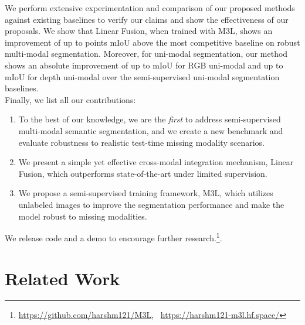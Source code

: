 \documentclass[10pt,twocolumn,letterpaper]{article}
\begin{document}
We perform extensive experimentation and comparison of our proposed methods against existing baselines to verify our claims and show the effectiveness of our proposals. We show that Linear Fusion, when trained with M3L, shows an improvement of up to  points mIoU above the most competitive baseline on robust multi-modal segmentation. Moreover, for uni-modal segmentation, our method shows an absolute improvement of up to  mIoU for RGB uni-modal and up to  mIoU for depth uni-modal over the semi-supervised uni-modal segmentation baselines.\\
Finally, we list all our contributions:

\begin{enumerate}

\item To the best of our knowledge, we are the \textit{first} to address semi-supervised multi-modal semantic segmentation, and we create a new benchmark and evaluate robustness to realistic test-time missing modality scenarios.

\item We present a simple yet effective cross-modal integration mechanism, Linear Fusion, which outperforms state-of-the-art \cite{tokenfusion} under limited supervision.


\item We propose a semi-supervised training framework, M3L, which utilizes unlabeled images to improve the segmentation performance and make the model robust to missing modalities. 

\end{enumerate}

\noindent We release code and a demo to encourage further research.\footnote{\href{https://github.com/harshm121/M3L}{https://github.com/harshm121/M3L}, ~\href{https://harshm121-m3l.hf.space/}{https://harshm121-m3l.hf.space/}}.

 \section{Related Work}
\end{document}
